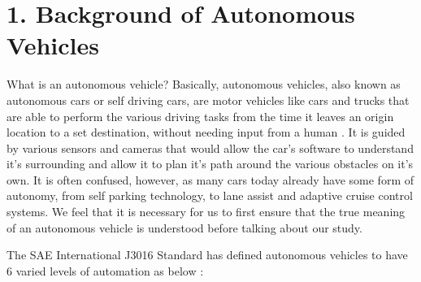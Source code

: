 \documentclass{sigchi}
\begin{document}
\section{1. Background of Autonomous Vehicles}
What is an autonomous vehicle? Basically, autonomous vehicles, also known as autonomous cars or self driving cars, are motor vehicles like cars and trucks that are able to perform the various driving tasks from the time it leaves an origin location to a set destination, without needing input from a human \cite{zon_ditta_2016}. It is guided by various sensors and cameras that would allow the car's software to understand it's surrounding and allow it to plan it's path around the various obstacles on it's own. It is often confused, however, as many cars today already have some form of autonomy, from self parking technology, to lane assist and adaptive cruise control systems. We feel that it is necessary for us to first ensure that the true meaning of an autonomous vehicle is understood before talking about our study.

The SAE International J3016 Standard has defined autonomous vehicles to have 6 varied levels of automation as below \cite{saej3106}\cite{nhtsa_2018}:
\end{document}
